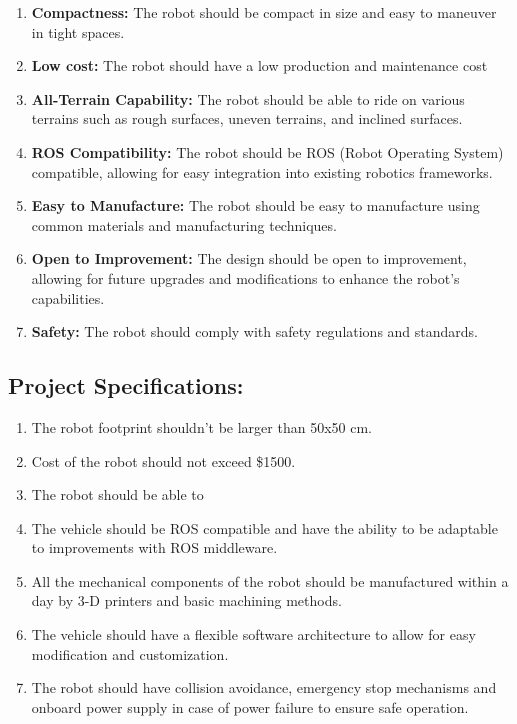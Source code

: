 \documentclass[12pt]{article}
\begin{document}
\begin{enumerate}
\item \textbf{Compactness:} The robot should be compact in size and easy to maneuver in tight spaces.
\item \textbf{Low cost:} The robot should have a low production and maintenance cost
\item \textbf{All-Terrain Capability:} The robot should be able to ride on various terrains such as rough surfaces, uneven terrains, and inclined surfaces.
\item \textbf{ROS Compatibility:} The robot should be ROS (Robot Operating System) compatible, allowing for easy integration into existing robotics frameworks.
\item \textbf{Easy to Manufacture:} The robot should be easy to manufacture using common materials and manufacturing techniques.
\item \textbf{Open to Improvement:} The design should be open to improvement, allowing for future upgrades and modifications to enhance the robot's capabilities.
\item \textbf{Safety:} The robot should comply with safety regulations and standards.
\end{enumerate}


\subsection*{Project Specifications:}

\begin{enumerate}
\item The robot footprint shouldn’t be larger than 50x50 cm.
\item Cost of the robot should not exceed \$1500.
\item The robot should be able to
\item The vehicle should be ROS compatible and have the ability to be adaptable to improvements with ROS middleware.
\item All the mechanical components of the robot should be manufactured within a day by 3-D printers and basic machining methods.
\item The vehicle should have a flexible software architecture to allow for easy modification and customization.
\item The robot should have collision avoidance, emergency stop mechanisms and onboard power supply in case of power failure to ensure safe operation.

\end{enumerate}


\end{document}
